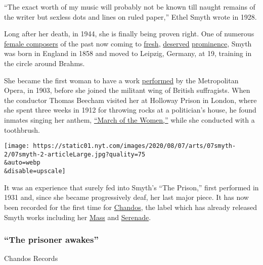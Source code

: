 ``The exact worth of my music will probably not be known till naught
remains of the writer but sexless dots and lines on ruled paper,'' Ethel
Smyth wrote in 1928.

Long after her death, in 1944, she is finally being proven right. One of
numerous
\href{https://www.nytimes.com/interactive/2016/12/02/arts/music/01womencomposers.html}{female
composers} of the past now coming to
\href{https://www.nytimes.com/2019/08/28/arts/music/clara-schumann.html}{fresh},
\href{https://www.nytimes.com/2018/02/09/arts/music/florence-price-arkansas-symphony-concerto.html}{deserved}
\href{https://www.nytimes.com/2020/06/07/arts/music/amy-beach-takacs-ohlsson.html}{prominence},
Smyth was born in England in 1858 and moved to Leipzig, Germany, at 19,
training in the circle around Brahms.

She became the first woman to have a work
\href{https://www.nytimes.com/2016/02/19/arts/design/ethel-m-smyth-opera-composer-met-a-chorus-of-critical-disdain-in-1903.html}{performed}
by the Metropolitan Opera, in 1903, before she joined the militant wing
of British suffragists. When the conductor Thomas Beecham visited her at
Holloway Prison in London, where she spent three weeks in 1912 for
throwing rocks at a politician's house, he found inmates singing her
anthem, \href{https://www.youtube.com/watch?v=qTYv4wT8g4E}{``March of
the Women,''} while she conducted with a toothbrush.

\texttt{[image: https://static01.nyt.com/images/2020/08/07/arts/07smyth-2/07smyth-2-articleLarge.jpg?quality=75\\\&auto=webp\\\&disable=upscale]}

It was an experience that surely fed into Smyth's ``The Prison,'' first
performed in 1931 and, since she became progressively deaf, her last
major piece. It has now been recorded for the first time for
\href{https://www.chandos.net/products/catalogue/CHAN\%25205279}{Chandos},
the label which has already released Smyth works including her
\href{https://open.spotify.com/album/0g11cYcXjkCurVlymY8Jup?si=o-j4j4MeRmeNP6EV7CjS3Q}{Mass}
and
\href{https://open.spotify.com/album/4UOW8vU6ZmGF44jo6GjLkl?si=OBCppwafT1yiVG8j6G2pvw}{Serenade}.

\hypertarget{the-prisoner-awakes}{%
\subsubsection{``The prisoner awakes''}\label{the-prisoner-awakes}}

Chandos Records

